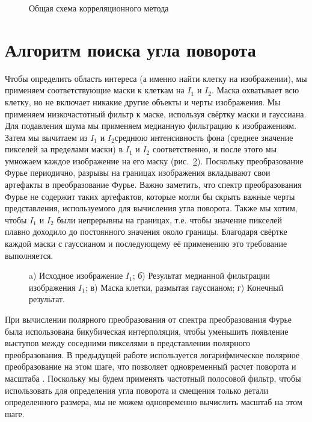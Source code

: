 \documentclass[oneside,final,14pt]{extreport}
\begin{document}
\begin{figure}[t]
\centering
\caption{Общая схема корреляционного метода}
\label{diag}
\end{figure}
\section{Алгоритм поиска угла поворота}
Чтобы определить область интереса (а именно найти клетку на изображении), мы применяем соответствующие маски к клеткам  на   \( I_\text{1} \) и \( I_\text{2} \). Маска охватывает всю клетку, но не включает никакие другие объекты и черты изображения. Мы применяем низкочастотный фильтр к маске, используя свёртку маски и гауссиана. Для подавления шума мы применяем медианную фильтрацию к изображениям. Затем мы вычитаем из  \( I_\text{1} \) и \( I_\text{2} \)среднюю интенсивность фона (среднее значение пикселей за пределами маски) в  \( I_\text{1} \) и \( I_\text{2} \) соответственно, и после этого мы умножаем каждое изображение на его маску (рис.~\ref{mask}).
Поскольку преобразование Фурье периодично, разрывы на границах изображения вкладывают свои артефакты в преобразование Фурье. Важно заметить, что спектр преобразования Фурье не содержит таких артефактов, которые могли бы скрыть важные черты представления, используемого для вычисления угла поворота. Также мы хотим, чтобы  \( I_\text{1} \) и  \( I_\text{2} \) были непрерывны на границах, т.е. чтобы значение пикселей плавно доходило до постоянного значения около границы. Благодаря свёртке каждой маски с гауссианом и последующему её применению это требование выполняется.
\begin{figure}[h!]
\begin{minipage}[h]{0.47\linewidth}
\end{minipage}
\hfill
\begin{minipage}[h]{0.47\linewidth}
\end{minipage}
\hfill
\begin{minipage}[h]{0.47\linewidth}
\end{minipage}
\hfill
\begin{minipage}[h]{0.47\linewidth}
\end{minipage}
\caption{a) Исходное изображение \(I_1\); б) Результат медианной фильтрации изображения \(I_1\); в)  Маска клетки, размытая гауссианом; г) Конечный результат.}
\label{mask}
\end{figure}
При вычислении полярного преобразования от спектра преобразования Фурье была использована бикубическая интерполяция, чтобы уменьшить появление выступов между соседними пикселями в представлении полярного преобразования. В предыдущей работе используется логарифмическое полярное преобразование на этом шаге, что позволяет одновременный расчет поворота и масштаба \cite{sheng1986experiments}. Поскольку мы будем применять частотный полосовой фильтр, чтобы использовать для определения угла поворота и смещения только детали определенного размера, мы не можем одновременно вычислить масштаб на этом шаге.
\end{document}
